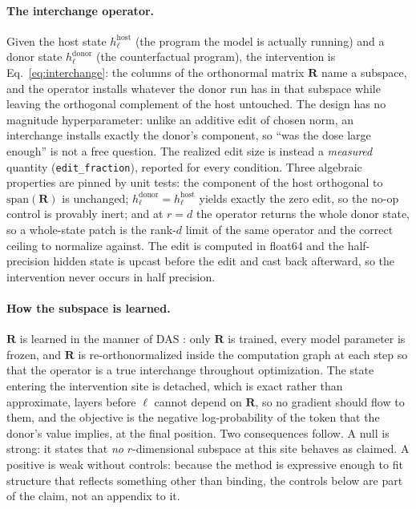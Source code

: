\documentclass[10pt]{article}
\newcommand{\hb}{h_{\ell}}
\newcommand{\Rmat}{\mathbf{R}}
\newcommand{\code}[1]{\texttt{#1}}
\begin{document}
\paragraph{The interchange operator.} Given the host state $\hb^{\mathrm{host}}$
(the program the model is actually running) and a donor state
$\hb^{\mathrm{donor}}$ (the counterfactual program), the intervention is
Eq.~\eqref{eq:interchange}: the columns of the orthonormal matrix $\Rmat$ name a
subspace, and the operator installs whatever the donor run has in that subspace
while leaving the orthogonal complement of the host untouched. The design has no
magnitude hyperparameter: unlike an additive edit of chosen norm, an interchange
installs exactly the donor's component, so ``was the dose large enough'' is not a
free question. The realized edit size is instead a \emph{measured} quantity
(\code{edit\_fraction}), reported for every condition. Three algebraic properties
are pinned by unit tests: the component of the host orthogonal to $\mathrm{span}(\Rmat)$
is unchanged; $\hb^{\mathrm{donor}}=\hb^{\mathrm{host}}$ yields exactly the zero
edit, so the no-op control is provably inert; and at $r=d$ the operator returns
the whole donor state, so a whole-state patch is the rank-$d$ limit of the same
operator and the correct ceiling to normalize against. The edit is computed in
float64 and the half-precision hidden state is upcast before the edit and cast
back afterward, so the intervention never occurs in half precision.

\paragraph{How the subspace is learned.} $\Rmat$ is learned in the manner of DAS
\citep{geiger2024das}: only $\Rmat$ is trained, every model parameter is frozen,
and $\Rmat$ is re-orthonormalized inside the computation graph at each step so
that the operator is a true interchange throughout optimization. The state
entering the intervention site is detached, which is exact rather than
approximate, layers before $\ell$ cannot depend on $\Rmat$, so no gradient
should flow to them, and the objective is the negative log-probability of the
token that the donor's value implies, at the final position. Two consequences
follow. A null is strong: it states that \emph{no} $r$-dimensional subspace at
this site behaves as claimed. A positive is weak without controls: because the
method is expressive enough to fit structure that reflects something other than
binding, the controls below are part of the claim, not an appendix to it.
\end{document}
